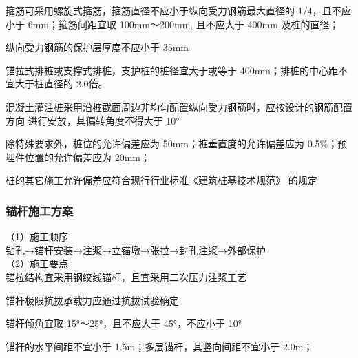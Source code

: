  箍筋可采用螺旋式箍筋，箍筋直径不应小于纵向受力钢筋最大直径的 1/4，且不应小于
6mm；箍筋间距宜取 100mm～200mm, 且不应大于 400mm 及桩的直径；

 纵向受力钢筋的保护层厚度不应小于 35mm

 锚拉式排桩或支撑式排桩，支护桩的桩径宜大于或等于 400mm；排桩的中心距不宜大于桩直径的 2.0倍。

 混凝土灌注桩采用沿桩截面周边非均匀配置纵向受力钢筋时，应按设计的钢筋配置方向
进行安放，其偏转角度不得大于 10°

 除特殊要求外，桩位的允许偏差应为 50mm；桩垂直度的允许偏差应为 0.5\%；预埋件位置的允许偏差应为 20mm；

 桩的其它施工允许偏差应符合现行行业标准《建筑桩基技术规范》 的规定

\begin{table}
    \centering
    \caption{土层系数表}
    \label{tab:c6t1}
    \end{table}   


\subsubsection{锚杆施工方案}

（1）施工顺序\\

钻孔→锚杆安装→注浆→立锚墩→张拉→封孔注浆→外部保护\\

（2）施工要点\\

 锚拉结构宜采用钢绞线锚杆，且宜采用二次压力注浆工艺

 锚杆极限抗拔承载力应通过抗拔试验确定

 锚杆倾角宜取 15°～25°，且不应大于 45°，不应小于 10°

 锚杆的水平间距不宜小于 1.5m；多层锚杆，其竖向间距不宜小于 2.0m；

